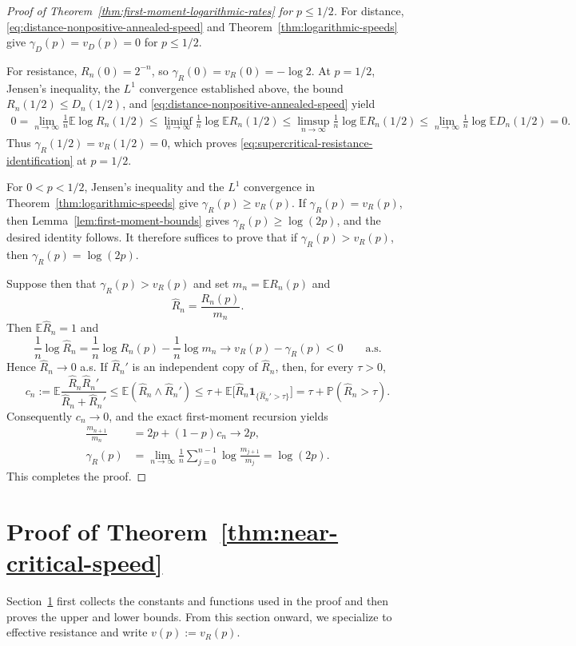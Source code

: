 \documentclass[12pt,preprint]{amsart}
\numberwithin{equation}{section}
\theoremstyle{plain}
\theoremstyle{definition}
\newcommand{\E}{\mathbb E}
\newcommand{\Pp}{\mathbb P}
\newcommand{\ind}{\mathbf 1}
\begin{document}
\begin{proof}[Proof of Theorem~\ref{thm:first-moment-logarithmic-rates}
for $p\le 1/2$]
For distance, \eqref{eq:distance-nonpositive-annealed-speed} and
Theorem~\ref{thm:logarithmic-speeds} give
$\gamma_D(p)=v_D(p)=0$ for $p\le1/2$.

For resistance, $R_n(0)=2^{-n}$, so
$\gamma_R(0)=v_R(0)=-\log2$.  At $p=1/2$,
Jensen's inequality, the $L^1$ convergence established above,
the bound $R_n(1/2)\le D_n(1/2)$, and
\eqref{eq:distance-nonpositive-annealed-speed} yield
\[
\begin{aligned}
 0
 =\lim_{n\to\infty}\frac1n\E\log R_n(1/2)
 \le\liminf_{n\to\infty}\frac1n\log\E R_n(1/2)
 \le\limsup_{n\to\infty}\frac1n\log\E R_n(1/2)
 \le\lim_{n\to\infty}\frac1n\log\E D_n(1/2)=0.
\end{aligned}
\]
Thus $\gamma_R(1/2)=v_R(1/2)=0$, which proves
\eqref{eq:supercritical-resistance-identification} at $p=1/2$.

For $0<p<1/2$, Jensen's inequality and the $L^1$ convergence in
Theorem~\ref{thm:logarithmic-speeds} give $\gamma_R(p)\ge v_R(p)$.
If $\gamma_R(p)=v_R(p)$, then Lemma~\ref{lem:first-moment-bounds} gives
$\gamma_R(p)\ge\log(2p)$, and the desired identity follows.  It therefore
suffices to prove that if $\gamma_R(p)>v_R(p)$, then
$\gamma_R(p)=\log(2p)$.

Suppose then that $\gamma_R(p)>v_R(p)$ and set
$m_n=\E R_n(p)$ and
\[
 \widehat R_n=\frac{R_n(p)}{m_n}.
\]
Then $\E\widehat R_n=1$ and
\[
 \frac1n\log\widehat R_n
 =\frac1n\log R_n(p)-\frac1n\log m_n
 \longrightarrow v_R(p)-\gamma_R(p)<0
 \qquad\text{a.s.}
\]
Hence $\widehat R_n\to0$ a.s.  If $\widehat R_n'$ is an independent copy of
$\widehat R_n$, then, for every $\tau>0$,
\[
 c_n:=\E\frac{\widehat R_n\widehat R_n'}
                    {\widehat R_n+\widehat R_n'}
 \le \E(\widehat R_n\wedge\widehat R_n')
 \le \tau+\E\bigl[\widehat R_n
                   \ind_{\{\widehat R_n'>\tau\}}\bigr]
 =\tau+\Pp(\widehat R_n>\tau).
\]
Consequently $c_n\to0$, and the exact first-moment recursion yields
\[
\begin{aligned}
 \frac{m_{n+1}}{m_n}
 &=2p+(1-p)c_n\longrightarrow2p,\\
 \gamma_R(p)
 &=\lim_{n\to\infty}\frac1n
   \sum_{j=0}^{n-1}\log\frac{m_{j+1}}{m_j}
 =\log(2p).
\end{aligned}
\]
This completes the proof.
\end{proof}

\section{Proof of Theorem~\ref{thm:near-critical-speed}}
\label{sec:two-sided-barriers}
Section~\ref{sec:two-sided-barriers} first collects the constants and
functions used in the proof and then proves the upper and lower bounds.
From this section onward, we specialize to effective resistance and write
$v(p):=v_R(p)$.
\end{document}
